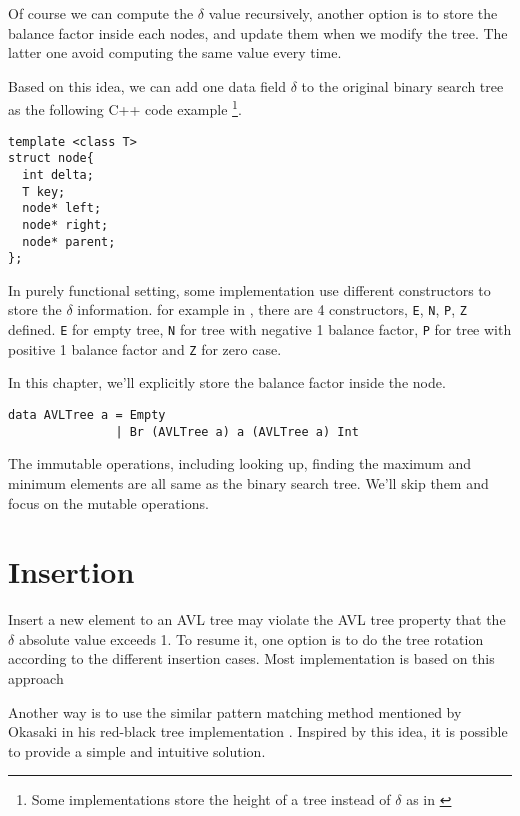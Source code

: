 \documentclass{article}
\begin{document}
Of course we can compute the $\delta$ value recursively, another option
is to store the balance factor inside each nodes, and update them
when we modify the tree. The latter one avoid computing the same value
every time.

Based on this idea, we can add one data field $\delta$ to the original
binary search tree as the following C++ code example \footnote{Some implementations store the height of a tree instead of $\delta$ as in \cite{py-avl}}.

\lstset{language=C++}
\begin{lstlisting}
template <class T>
struct node{
  int delta;
  T key;
  node* left;
  node* right;
  node* parent;
};
\end{lstlisting}

In purely functional setting, some implementation use different
constructors to store the $\delta$ information. for example in
\cite{hackage}, there are 4 constructors, \texttt{E}, \texttt{N}, \texttt{P}, \texttt{Z} defined.
\texttt{E} for empty tree, \texttt{N} for tree with negative 1 balance factor,
\texttt{P} for tree with positive 1 balance factor and \texttt{Z} for zero case.

In this chapter, we'll explicitly store the balance factor inside
the node.

\lstset{language=Haskell}
\begin{lstlisting}
data AVLTree a = Empty
               | Br (AVLTree a) a (AVLTree a) Int
\end{lstlisting}

The immutable operations, including looking up, finding the maximum
and minimum elements are all same as the binary search tree. We'll
skip them and focus on the mutable operations.

\section{Insertion}

Insert a new element to an AVL tree may violate the AVL tree property
that the $\delta$ absolute value exceeds 1. To resume it, one option
is to do the tree rotation according to the different insertion cases.
Most implementation is based on this approach

Another way is to use the similar pattern matching method mentioned by
Okasaki in his red-black tree implementation \cite{okasaki}. Inspired
by this idea, it is possible to provide a simple and intuitive
solution.
\end{document}
